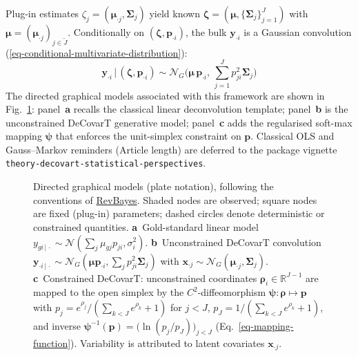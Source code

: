 \documentclass[pdflatex, sn-nature]{sn-jnl}
\theoremstyle{thmstyleone}%
\theoremstyle{thmstyletwo}%
\theoremstyle{thmstylethree}%
\begin{document}
    Plug-in estimates
    $\zeta_{j}=(\boldsymbol{\mu}_{\cdot j},\boldsymbol{\Sigma}_{j})$ yield
    known
    $\boldsymbol{\zeta}=(\boldsymbol{\mu},\{\boldsymbol{\Sigma}_{j}\}_{j=1}^{J})$
    with $\boldsymbol{\mu}=(\boldsymbol{\mu}_{\cdot j})_{j\in\widetilde{J}}$.
    Conditionally on $(\boldsymbol{\zeta},\boldsymbol{p}_{\cdot i})$, the bulk
    $\boldsymbol{y}_{\cdot i}$ is a Gaussian convolution
    (\ref{eq-conditional-multivariate-distribution}):
    \begin{equation}
        \boldsymbol{y}_{\cdot i}\,|\,(\boldsymbol{\zeta},\boldsymbol{p}_{\cdot i})
        \sim\mathcal{N}_{G}\!\bigl(
        \boldsymbol{\mu}\,\boldsymbol{p}_{\cdot i},\,
        \textstyle\sum_{j=1}^{J}p_{ji}^{2}\boldsymbol{\Sigma}_{j}
        \bigr)
        \label{eq-conditional-multivariate-distribution}
    \end{equation}
    The directed graphical models associated with this framework are shown in
    Fig.~\ref{fig:DAG-model}: panel~\textbf{a} recalls the classical linear
    deconvolution template; panel~\textbf{b} is the unconstrained DeCovarT
    generative model; panel~\textbf{c} adds the regularised soft-max mapping
    $\boldsymbol{\psi}$ that enforces the unit-simplex constraint on
    $\boldsymbol{p}$. Classical OLS and Gauss--Markov reminders (Article length)
    are deferred to the package vignette
    \texttt{theory-decovart-statistical-perspectives}.

    \begin{figure}[t]
        \centering
        
        \caption[DAG models for linear and DeCovarT deconvolution]{%
            Directed graphical models (plate notation), following the conventions
            of \href{https://revbayes.github.io/tutorials/intro/graph_models.html}{RevBayes}.
            Shaded nodes are observed; square nodes are fixed (plug-in) parameters;
            dashed circles denote deterministic or constrained quantities.
            \textbf{a}~Gold-standard linear model
            $y_{gi\,|\,\cdot}\sim\mathcal{N}(\sum_{j}\mu_{gj}p_{ji},
            \sigma_{i}^{2})$.
            \textbf{b}~Unconstrained DeCovarT convolution
            $\boldsymbol{y}_{\cdot i\,|\,\cdot}\sim\mathcal{N}_{G}(\boldsymbol{\mu}
            \boldsymbol{p}_{\cdot i},\sum_{j}p_{ji}^{2}\boldsymbol{\Sigma}_{j})$ with
            $\boldsymbol{x}_{\cdot j}\sim\mathcal{N}_{G}(\boldsymbol{\mu}_{\cdot j},
            \boldsymbol{\Sigma}_{j})$.
            \textbf{c}~Constrained DeCovarT: unconstrained coordinates
            $\boldsymbol{\rho}_{i}\in\mathbb{R}^{J-1}$ are mapped to the open
            simplex by the $C^{2}$-diffeomorphism
            $\boldsymbol{\psi}:\boldsymbol{\rho}\mapsto\boldsymbol{p}$ with
            $p_{j}=e^{\rho_{j}}/(\sum_{k<J}e^{\rho_{k}}+1)$ for $j<J$,
            $p_{J}=1/(\sum_{k<J}e^{\rho_{k}}+1)$, and inverse
            $\boldsymbol{\psi}^{-1}(\boldsymbol{p})=
            \bigl(\ln(p_{j}/p_{J})\bigr)_{j<J}$
            (Eq.~\ref{eq-mapping-function}).
            Variability is attributed to latent covariates
            $\boldsymbol{x}_{\cdot j}$.%
        }
        \label{fig:DAG-model}
    \end{figure}
\end{document}
